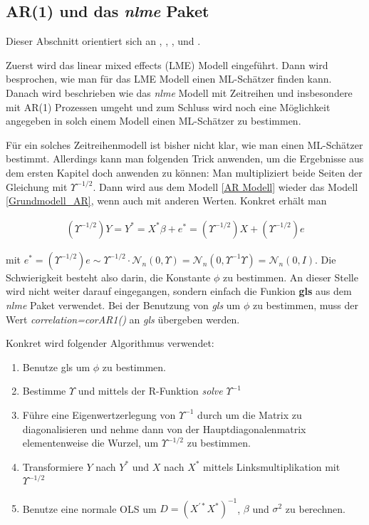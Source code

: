 \documentclass[12pt,a4paper]{article}
\theoremstyle{definition}
\theoremstyle{definition}
\theoremstyle{definition}
\theoremstyle{definition}
\begin{document}
\subsection{AR(1) und das \textit{nlme} Paket}
\label{AR(1) und das nlme Paket}

Dieser Abschnitt orientiert sich an \cite[58-59]{Pinheiro00}, \cite[62-66]{Pinheiro00}, \cite[229]{Pinheiro00}, \cite[235]{Pinheiro00} und \cite[202,203]{Pinheiro00}. 

Zuerst wird das linear mixed effects (LME) Modell eingeführt. Dann wird besprochen, wie man für das LME Modell einen ML-Schätzer finden kann. Danach wird beschrieben wie das \textit{nlme} Modell mit Zeitreihen und insbesondere mit AR(1) Prozessen umgeht und zum Schluss wird noch eine Möglichkeit angegeben in solch einem Modell einen ML-Schätzer zu bestimmen.

Für ein solches Zeitreihenmodell ist bisher nicht klar, wie man einen ML-Schätzer bestimmt. Allerdings kann man folgenden Trick anwenden, um die Ergebnisse aus dem ersten Kapitel doch anwenden zu können: Man multipliziert beide Seiten der Gleichung mit $\Upsilon^{-1/2}$. Dann wird aus dem Modell \eqref{AR Modell} wieder das Modell \eqref{Grundmodell_AR}, wenn auch mit anderen Werten. Konkret erhält man

\begin{align} \label{AR rück}
(\Upsilon^{-1/2})Y = Y^{*} = X^{*} \beta + e^{*} = (\Upsilon^{-1/2})X + (\Upsilon^{-1/2})e
\end{align}

mit $e^{*} = (\Upsilon^{-1/2})e \sim \Upsilon^{-1/2} \cdot \mathscr{N}_{n}(0,\Upsilon) = \mathscr{N}_{n}(0,\Upsilon^{-1}\Upsilon) = \mathscr{N}_{n}(0,I)$. Die Schwierigkeit besteht also darin, die Konstante $\phi$ zu bestimmen. An dieser Stelle wird nicht weiter darauf eingegangen, sondern einfach die Funkion \textbf{gls} aus dem \textit{nlme} Paket verwendet. Bei der Benutzung von \textit{gls} um $\phi$ zu bestimmen, muss der Wert \textit{correlation=corAR1()} an \textit{gls} übergeben werden.

Konkret wird folgender Algorithmus verwendet:

\begin{enumerate}
\item Benutze gls um $\phi$ zu bestimmen.
\item Bestimme $\Upsilon$ und mittels der R-Funktion \textit{solve} $\Upsilon^{-1}$ 
\item Führe eine Eigenwertzerlegung von $\Upsilon^{-1}$ durch um die Matrix zu diagonalisieren und nehme dann von der Hauptdiagonalenmatrix elementenweise die Wurzel, um $\Upsilon^{-1/2}$ zu bestimmen.
\item Transformiere $Y$ nach $Y^{*}$ und $X$ nach $X^{*}$ mittels Linksmultiplikation mit $\Upsilon^{-1/2}$
\item Benutze eine normale OLS um $D=(X^{'*}X^{*})^{-1}$, $\beta$ und $\sigma^2$ zu berechnen.
\end{enumerate}
\end{document}
